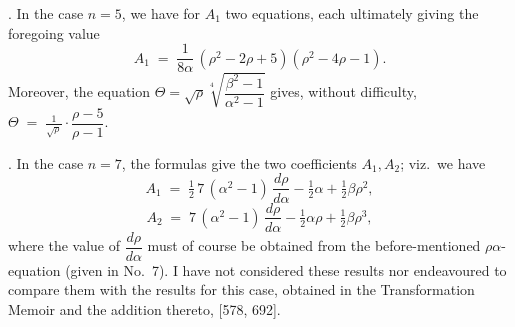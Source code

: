 \documentclass[11pt]{article}
\begin{document}
\medskip

. In the case $n = 5$, we have for $A_1$ two equations, each ultimately giving the foregoing value
\[
A_1 \;=\; \frac{1}{8\alpha}\,(\rho^2 - 2\rho + 5)(\rho^2 - 4\rho - 1).
\]
Moreover, the equation $\Theta = \sqrt{\rho}\sqrt[4]{\dfrac{\beta^2 - 1}{\alpha^2 - 1}}$ gives, without difficulty, $\Theta \;=\; \tfrac{1}{\sqrt{\rho}}\cdot\dfrac{\rho - 5}{\rho - 1}$.

\medskip

. In the case $n = 7$, the formulas give the two coefficients $A_1, A_2$; viz.\ we have
\[
A_1 \;=\; \tfrac{1}{2}\,7\,(\alpha^2 - 1)\,\frac{d\rho}{d\alpha} - \tfrac{1}{2}\alpha + \tfrac{1}{2}\beta\rho^2,
\]
\[
A_2 \;=\; 7\,(\alpha^2 - 1)\,\frac{d\rho}{d\alpha} - \tfrac{1}{2}\alpha\rho + \tfrac{1}{2}\beta\rho^3,
\]
where the value of $\dfrac{d\rho}{d\alpha}$ must of course be obtained from the before-mentioned $\rho\alpha$-equation (given in No.~7). I have not considered these results nor endeavoured to compare them with the results for this case, obtained in the Transformation Memoir and the addition thereto, [578, 692].
\end{document}
